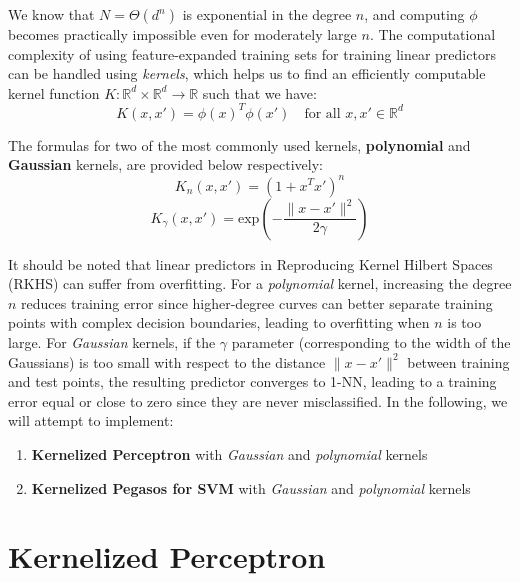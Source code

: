 
We know that $N = \Theta(d^n)$ is exponential in the degree $n$, and computing $\phi$ becomes practically impossible even for moderately large $n$. The computational complexity of using feature-expanded training sets for training linear predictors can be handled using \textit{kernels}, which helps us to find an efficiently computable kernel function $K: \mathbb{R}^d \times \mathbb{R}^d \rightarrow \mathbb{R}$ such that we have:
\begin{equation}
    K(x,x') = \phi(x)^T \phi(x') \quad \text{for all } x, x' \in \mathbb{R}^d
\end{equation}

The formulas for two of the most commonly used kernels, \textbf{polynomial} and \textbf{Gaussian} kernels, are provided below respectively:
\begin{equation}
    K_n(x,x') = (1 + x^T x')^n
\end{equation}
\begin{equation}
    K_\gamma(x,x') = \text{exp}\left(- \frac{\|x - x'\|^2}{2\gamma} \right)
\end{equation}

It should be noted that linear predictors in Reproducing Kernel Hilbert Spaces (RKHS) can suffer from overfitting. For a \textit{polynomial} kernel, increasing the degree $n$ reduces training error since higher-degree curves can better separate training points with complex decision boundaries, leading to overfitting when $n$ is too large. For \textit{Gaussian} kernels, if the $\gamma$ parameter (corresponding to the width of the Gaussians) is too small with respect to the distance $\|x - x'\|^2$ between
training and test points, the resulting predictor converges to 1-NN, leading to a training error equal or close to zero since they are never misclassified. In the following, we will attempt to implement:
\begin{enumerate}
    \item \textbf{Kernelized Perceptron} with \textit{Gaussian} and \textit{polynomial} kernels
    \item \textbf{Kernelized Pegasos for SVM} with \textit{Gaussian} and \textit{polynomial} kernels
\end{enumerate}


\section{Kernelized Perceptron}

